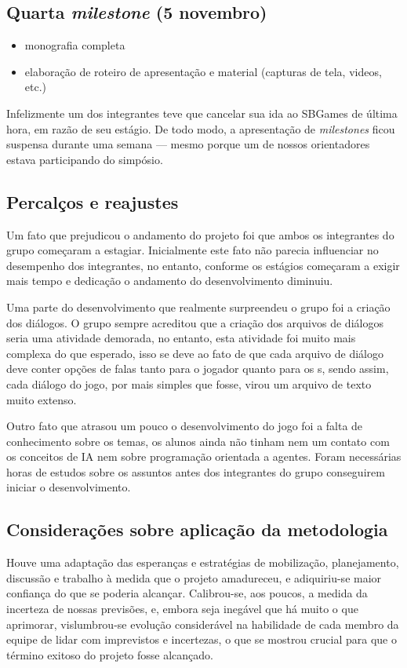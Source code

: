 \subsection{Quarta \emph{milestone} (5 novembro)}
\begin{itemize}
\item monografia completa
\item elaboração de roteiro de apresentação e material (capturas de tela, videos, etc.)
\end{itemize}

Infelizmente um dos integrantes teve que cancelar sua ida ao SBGames de última hora, em razão de seu estágio. De todo modo, a apresentação de \emph{\emph{milestone}s} ficou suspensa durante uma semana --- mesmo porque um de nossos orientadores estava participando do simpósio.

\subsection{Percalços e reajustes}

Um fato que prejudicou o andamento do projeto foi que ambos os
integrantes do grupo começaram a estagiar. Inicialmente este fato não
parecia influenciar no desempenho dos integrantes, no entanto,
conforme os estágios começaram a exigir mais tempo e dedicação o
andamento do desenvolvimento diminuiu.

Uma parte do desenvolvimento que realmente surpreendeu o grupo foi a
criação dos diálogos. O grupo sempre acreditou que a criação dos
arquivos de diálogos seria uma atividade demorada, no entanto, esta
atividade foi muito mais complexa do que esperado, isso se deve ao
fato de que cada arquivo de diálogo deve conter opções de falas tanto
para o jogador quanto para os \npc{}s, sendo assim, cada diálogo do
jogo, por mais simples que fosse, virou um arquivo de texto muito
extenso.

Outro fato que atrasou um pouco o desenvolvimento do jogo foi a falta de
conhecimento sobre os temas, os alunos ainda não tinham nem um contato
com os conceitos de IA nem sobre programação orientada a
agentes. Foram necessárias horas de estudos sobre os assuntos antes
dos integrantes do grupo conseguirem iniciar o desenvolvimento.


\subsection{Considerações sobre aplicação da metodologia}

Houve uma adaptação das esperanças e
estratégias de mobilização, planejamento, discussão e trabalho à
medida que o projeto amadureceu, e adiquiriu-se maior confiança do que
se poderia alcançar. Calibrou-se, aos poucos, a medida da incerteza de
nossas previsões, e, embora seja inegável que há muito o que
aprimorar, vislumbrou-se evolução considerável na habilidade de cada
membro da equipe de lidar com imprevistos e incertezas, o que se
mostrou crucial para que o término exitoso do projeto fosse alcançado.





